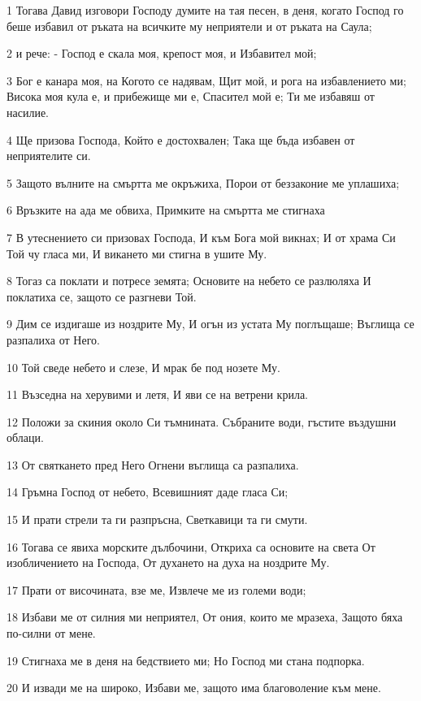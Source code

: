 \par 1 Тогава Давид изговори Господу думите на тая песен, в деня, когато Господ го беше избавил от ръката на всичките му неприятели и от ръката на Саула;
\par 2 и рече: - Господ е скала моя, крепост моя, и Избавител мой;
\par 3 Бог е канара моя, на Когото се надявам, Щит мой, и рога на избавлението ми; Висока моя кула е, и прибежище ми е, Спасител мой е; Ти ме избавяш от насилие.
\par 4 Ще призова Господа, Който е достохвален; Така ще бъда избавен от неприятелите си.
\par 5 Защото вълните на смъртта ме окръжиха, Порои от беззаконие ме уплашиха;
\par 6 Връзките на ада ме обвиха, Примките на смъртта ме стигнаха
\par 7 В утеснението си призовах Господа, И към Бога мой викнах; И от храма Си Той чу гласа ми, И викането ми стигна в ушите Му.
\par 8 Тогаз са поклати и потресе земята; Основите на небето се разлюляха И поклатиха се, защото се разгневи Той.
\par 9 Дим се издигаше из ноздрите Му, И огън из устата Му поглъщаше; Въглища се разпалиха от Него.
\par 10 Той сведе небето и слезе, И мрак бе под нозете Му.
\par 11 Възседна на херувими и летя, И яви се на ветрени крила.
\par 12 Положи за скиния около Си тъмнината. Събраните води, гъстите въздушни облаци.
\par 13 От святкането пред Него Огнени въглища са разпалиха.
\par 14 Гръмна Господ от небето, Всевишният даде гласа Си;
\par 15 И прати стрели та ги разпръсна, Светкавици та ги смути.
\par 16 Тогава се явиха морските дълбочини, Откриха са основите на света От изобличението на Господа, От духането на духа на ноздрите Му.
\par 17 Прати от височината, взе ме, Извлече ме из големи води;
\par 18 Избави ме от силния ми неприятел, От ония, които ме мразеха, Защото бяха по-силни от мене.
\par 19 Стигнаха ме в деня на бедствието ми; Но Господ ми стана подпорка.
\par 20 И извади ме на широко, Избави ме, защото има благоволение към мене.
